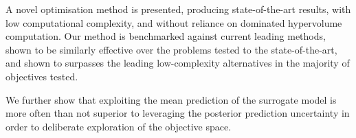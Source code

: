 \documentclass[conference]{IEEEtran}
\newcommand\hpv{dominated hypervolume\xspace}
\begin{document}
A novel optimisation method is presented, producing state-of-the-art results, with low computational complexity, and without reliance on \hpv computation. Our method is benchmarked against current leading methods, shown to be similarly effective over the problems tested to the state-of-the-art, and shown to surpasses the leading low-complexity alternatives in the majority of objectives tested. 

We further show that exploiting the mean prediction of the surrogate model is more often than not superior to leveraging the posterior prediction uncertainty in order to deliberate exploration of the objective space. 






\end{document}
